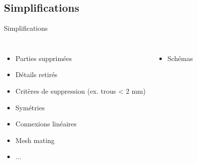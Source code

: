 \subsection{Simplifications}
\label{sec:Simplifications}

\begin{frame}[c]{Simplifications}
  \begin{columns}
    \begin{itemize}
        \item Parties supprimées
        \item Détails retirés
        \item Critères de suppression (ex. trous < 2 mm)
        \item Symétries
        \item Connexions linéaires
        \item Mesh mating
        \item ...
    \end{itemize}
    
    \begin{itemize}
        \item Schémas
    \end{itemize}
  \end{columns}
\end{frame}